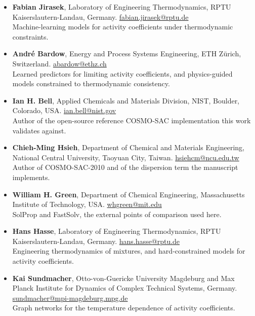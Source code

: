 \documentclass[11pt]{article}
\begin{document}
\begin{itemize}
\item \textbf{Fabian Jirasek}, Laboratory of Engineering Thermodynamics, RPTU
      Kaiserslautern-Landau, Germany. \href{mailto:fabian.jirasek@rptu.de}{fabian.jirasek@rptu.de}
      \\ Machine-learning models for activity coefficients under thermodynamic constraints.
\item \textbf{André Bardow}, Energy and Process Systems Engineering, ETH Zürich, Switzerland.
      \href{mailto:abardow@ethz.ch}{abardow@ethz.ch}
      \\ Learned predictors for limiting activity coefficients, and physics-guided models
      constrained to thermodynamic consistency.
\item \textbf{Ian H. Bell}, Applied Chemicals and Materials Division, NIST, Boulder, Colorado, USA.
      \href{mailto:ian.bell@nist.gov}{ian.bell@nist.gov}
      \\ Author of the open-source reference COSMO-SAC implementation this work validates against.
\item \textbf{Chieh-Ming Hsieh}, Department of Chemical and Materials Engineering, National Central
      University, Taoyuan City, Taiwan. \href{mailto:hsiehcm@ncu.edu.tw}{hsiehcm@ncu.edu.tw}
      \\ Author of COSMO-SAC-2010 and of the dispersion term the manuscript implements.
\item \textbf{William H. Green}, Department of Chemical Engineering, Massachusetts Institute of
      Technology, USA. \href{mailto:whgreen@mit.edu}{whgreen@mit.edu}
      \\ SolProp and FastSolv, the external points of comparison used here.
\item \textbf{Hans Hasse}, Laboratory of Engineering Thermodynamics, RPTU Kaiserslautern-Landau,
      Germany. \href{mailto:hans.hasse@rptu.de}{hans.hasse@rptu.de}
      \\ Engineering thermodynamics of mixtures, and hard-constrained models for activity
      coefficients.
\item \textbf{Kai Sundmacher}, Otto-von-Guericke University Magdeburg and Max Planck Institute for
      Dynamics of Complex Technical Systems, Germany.
      \href{mailto:sundmacher@mpi-magdeburg.mpg.de}{sundmacher@mpi-magdeburg.mpg.de}
      \\ Graph networks for the temperature dependence of activity coefficients.
\end{itemize}
\end{document}
